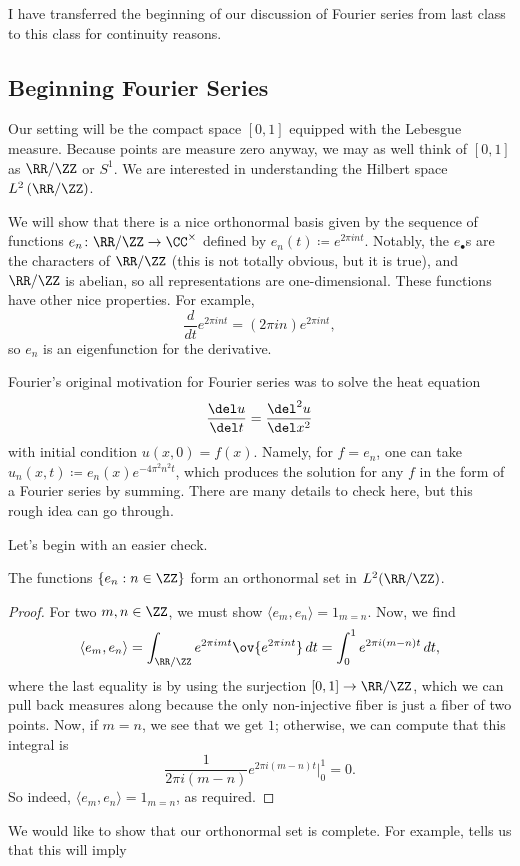 \documentclass[../notes.tex]{subfiles}
\begin{document}
I have transferred the beginning of our discussion of Fourier series from last class to this class for continuity reasons.

\subsection{Beginning Fourier Series}
Our setting will be the compact space $[0,1]$ equipped with the Lebesgue measure. Because points are measure zero anyway, we may as well think of $[0,1]$ as $\RR/\ZZ$ or $S^1$. We are interested in understanding the Hilbert space $L^2\left(\RR/\ZZ\right)$.

We will show that there is a nice orthonormal basis given by the sequence of functions $e_n\colon \RR/\ZZ\to\CC^\times$ defined by $e_n(t)\coloneqq e^{2\pi int}$. Notably, the $e_\bullet$s are the characters of $\RR/\ZZ$ (this is not totally obvious, but it is true), and $\RR/\ZZ$ is abelian, so all representations are one-dimensional. These functions have other nice properties. For example,
\[\frac d{dt}e^{2\pi int}=(2\pi in)e^{2\pi int},\]
so $e_n$ is an eigenfunction for the derivative.
\begin{remark}
	Fourier's original motivation for Fourier series was to solve the heat equation
	\[\frac{\del u}{\del t}=\frac{\del^2u}{\del x^2}\]
	with initial condition $u(x,0)=f(x)$. Namely, for $f=e_n$, one can take $u_n(x,t)\coloneqq e_n(x)e^{-4\pi^2n^2t}$, which produces the solution for any $f$ in the form of a Fourier series by summing. There are many details to check here, but this rough idea can go through.
\end{remark}
Let's begin with an easier check.
\begin{lemma} \label{lem:exp-is-orthonormal}
	The functions $\{e_n:n\in\ZZ\}$ form an orthonormal set in $L^2(\RR/\ZZ)$.
\end{lemma}
\begin{proof}
	For two $m,n\in\ZZ$, we must show $\langle e_m,e_n\rangle=1_{m=n}$. Now, we find
	\[\langle e_m,e_n\rangle = \int_{\RR/\ZZ}e^{2\pi imt}\ov{e^{2\pi int}}\,dt = \int_{0}^1e^{2\pi i(m-n)t}\,dt,\]
	where the last equality is by using the surjection $[0,1]\to\RR/\ZZ$, which we can pull back measures along because the only non-injective fiber is just a fiber of two points. Now, if $m=n$, we see that we get $1$; otherwise, we can compute that this integral is
	\[\frac1{2\pi i(m-n)}e^{2\pi i(m-n)t}\bigg|_0^1=0.\]
	So indeed, $\langle e_m,e_n\rangle=1_{m=n}$, as required.
\end{proof}
We would like to show that our orthonormal set is complete. For example,  tells us that this will imply
\end{document}
